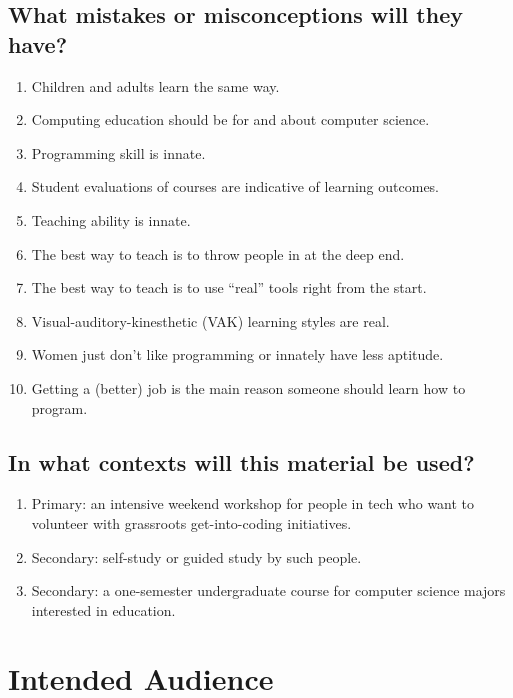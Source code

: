\subsection*{What mistakes or misconceptions will they have?}

  \begin{enumerate}
  \item
    Children and adults learn the same way.
  \item
    Computing education should be for and about computer science.
  \item
    Programming skill is innate.
  \item
    Student evaluations of courses are indicative of learning
    outcomes.
  \item
    Teaching ability is innate.
  \item
    The best way to teach is to throw people in at the deep end.
  \item
    The best way to teach is to use ``real'' tools right from the
    start.
  \item
    Visual-auditory-kinesthetic (VAK) learning styles are real.
  \item
    Women just don't like programming or innately have less
    aptitude.
  \item
    Getting a (better) job is the main reason someone should learn
    how to program.
  \end{enumerate}

\subsection*{In what contexts will this material be used?}

  \begin{enumerate}
  \item
    Primary: an intensive weekend workshop for people in tech who
    want to volunteer with grassroots get-into-coding initiatives.
  \item
    Secondary: self-study or guided study by such people.
  \item
    Secondary: a one-semester undergraduate course for computer
    science majors interested in education.
  \end{enumerate}

\section{Intended Audience}\label{s:v3-intended-audience}

